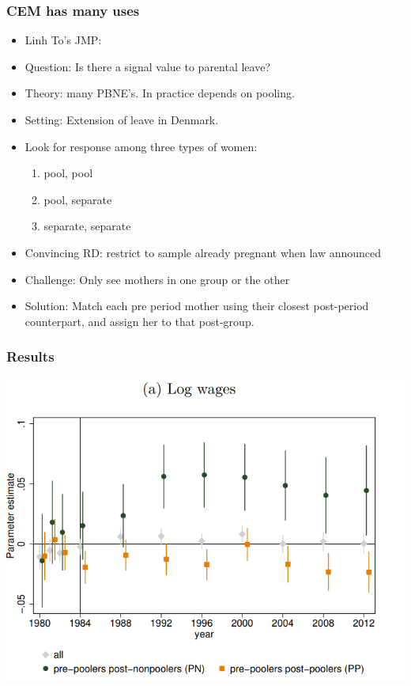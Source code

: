 \begin{frame}
  \frametitle{CEM has many uses}
  \begin{itemize}
  \item Linh To's JMP: 
  \item Question: Is there a signal value to parental leave? 
  \item Theory: many PBNE's. In practice depends on pooling. 
  \item Setting: Extension of leave in Denmark. 
  \item Look for response among three types of women: 
  \begin{enumerate}
    \item pool, pool
    \item pool, separate
    \item separate, separate
  \end{enumerate}
  \item Convincing RD: restrict to sample already pregnant when law announced 
  \item Challenge: Only see mothers in one group or the other
  \item Solution: Match each pre period mother using their closest post-period counterpart, and assign her to that post-group. 
  \end{itemize}
\end{frame}

\begin{frame}
  \frametitle{Results}
  \begin{center}
    \includegraphics[width=.9\textwidth]{./resources/ToPooling}
  \end{center}  
\end{frame}

